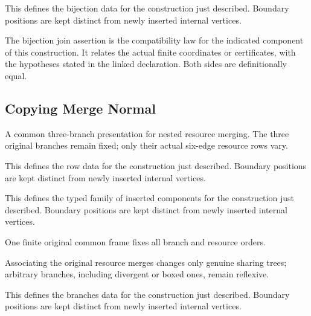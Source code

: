 This defines the bijection data for the construction just described. Boundary positions are kept distinct from newly inserted internal vertices.
\par{}

The bijection join assertion is the compatibility law for the indicated component of this construction. It relates the actual finite coordinates or certificates, with the hypotheses stated in the linked declaration.
Both sides are definitionally equal.
\par{}

\subsection{Copying Merge Normal}
A common three-branch presentation for nested resource merging. The three original branches remain fixed; only their actual six-edge resource rows vary.

This defines the row data for the construction just described. Boundary positions are kept distinct from newly inserted internal vertices.
\par{}

This defines the typed family of inserted components for the construction just described. Boundary positions are kept distinct from newly inserted internal vertices.
\par{}

One finite original common frame fixes all branch and resource orders.
\par{}

Associating the original resource merges changes only genuine sharing trees; arbitrary branches, including divergent or boxed ones, remain reflexive.
\par{}

This defines the branches data for the construction just described. Boundary positions are kept distinct from newly inserted internal vertices.
\par{}

